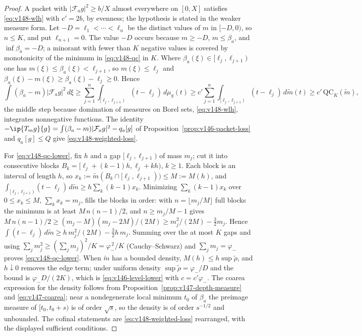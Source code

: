 \begin{proof}
A packet with $|\mathcal F_ag|^2\ge b/X$ almost everywhere on $[0,X]$
satisfies \eqref{eq:v148-wlh} with $c'=2b$, by evenness; the hypothesis is
stated in the weaker measure form. Let $-D=\ell_1<\cdots<\ell_n$ be the
distinct values of $m$ in $[-D,0)$, so $n\le K$, and put $\ell_{n+1}=0$.
The value $-D$ occurs because $m\ge-D$, $m\le\beta_a$, and
$\inf\beta_a=-D$; a minorant with fewer than $K$ negative values is
covered by monotonicity of the minimum in \eqref{eq:v148-qc} in $K$. Where
$\beta_a(\xi)\in[\ell_j,\ell_{j+1})$ one has $m(\xi)\le\beta_a(\xi)<\ell_{j+1}$,
so $m(\xi)\le\ell_j$ and $\beta_a(\xi)-m(\xi)\ge\beta_a(\xi)-\ell_j\ge0$.
Hence
\[
 \int(\beta_a-m)|\mathcal F_ag|^2\,d\xi
 \ge\sum_{j=1}^{n}\int_{[\ell_j,\ell_{j+1})}(t-\ell_j)\,d\mu_g(t)
 \ge c'\sum_{j=1}^{n}\int_{[\ell_j,\ell_{j+1})}(t-\ell_j)\,d\widetilde m(t)
 \ge c'\,\mathrm{QC}_K(\widetilde m),
\]
the middle step because domination of measures on Borel sets,
\eqref{eq:v148-wlh}, integrates nonnegative functions. The identity
$-\ip{T_mg}{g}=\int(\beta_a-m)|\mathcal F_ag|^2-q_a[g]$ of
Proposition~\ref{prop:v146-packet-loss} and $q_a[g]\le Q$ give
\eqref{eq:v148-weighted-loss}.

For \eqref{eq:v148-qc-lower}, fix $h$ and a gap $[\ell_j,\ell_{j+1})$ of
mass $m_j$; cut it into consecutive blocks $B_k=[\ell_j+(k-1)h,\ell_j+kh)$,
$k\ge1$. Each block is an interval of length $h$, so
$x_k:=\widetilde m(B_k\cap[\ell_j,\ell_{j+1}))\le M:=M(h)$, and
$\int_{[\ell_j,\ell_{j+1})}(t-\ell_j)\,d\widetilde m\ge h\sum_k(k-1)x_k$.
Minimizing $\sum_k(k-1)x_k$ over $0\le x_k\le M$, $\sum_kx_k=m_j$, fills the
blocks in order: with $n=\lfloor m_j/M\rfloor$ full blocks the minimum is
at least $M\,n(n-1)/2$, and $n\ge m_j/M-1$ gives
$M\,n(n-1)/2\ge(m_j-M)(m_j-2M)/(2M)\ge m_j^2/(2M)-\tfrac32m_j$. Hence
$\int(t-\ell_j)\,d\widetilde m\ge h\,m_j^2/(2M)-\tfrac32h\,m_j$. Summing over
the at most $K$ gaps and using $\sum_jm_j^2\ge(\sum_jm_j)^2/K=\varphi_-^{\,2}/K$
(Cauchy--Schwarz) and $\sum_jm_j=\varphi_-$ proves \eqref{eq:v148-qc-lower}.
When $\widetilde m$ has a bounded density, $M(h)\le h\sup\widetilde\rho$,
and $h\downarrow0$ removes the edge term; under uniform density
$\sup\widetilde\rho=\varphi_-/D$ and the bound is $\varphi_-D/(2K)$, which
is \eqref{eq:v146-level-lower} with $c=c'\varphi_-$. The coarea expression
for the density follows from Proposition~\ref{prop:v147-depth-measure} and
\eqref{eq:v147-coarea}; near a nondegenerate local minimum $t_0$ of $\beta_a$
the preimage measure of $[t_0,t_0+s)$ is of order $\sqrt s$, so the density
is of order $s^{-1/2}$ and unbounded. The cofinal statements are
\eqref{eq:v148-weighted-loss} rearranged, with the displayed sufficient
conditions.
\end{proof}

